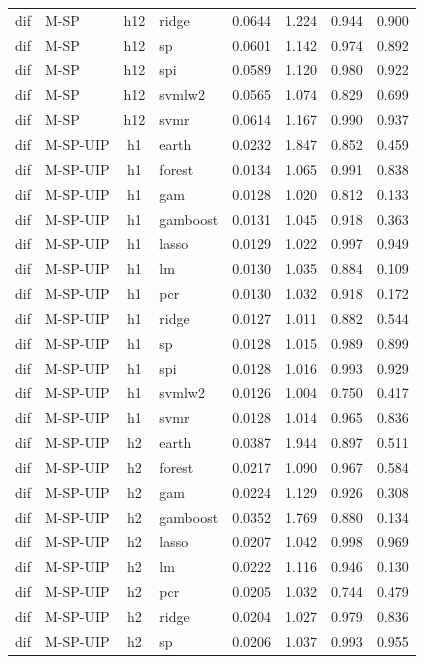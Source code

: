 \begin{ThreePartTable}
\begin{longtable}[t]{llclcccc}
dif & M-SP & h12 & ridge & 0.0644 & 1.224 & 0.944 & 0.900\\
dif & M-SP & h12 & sp & 0.0601 & 1.142 & 0.974 & 0.892\\
dif & M-SP & h12 & spi & 0.0589 & 1.120 & 0.980 & 0.922\\
dif & M-SP & h12 & svmlw2 & 0.0565 & 1.074 & 0.829 & 0.699\\
dif & M-SP & h12 & svmr & 0.0614 & 1.167 & 0.990 & 0.937\\
\addlinespace
dif & M-SP-UIP & h1 & earth & 0.0232 & 1.847 & 0.852 & 0.459\\
dif & M-SP-UIP & h1 & forest & 0.0134 & 1.065 & 0.991 & 0.838\\
dif & M-SP-UIP & h1 & gam & 0.0128 & 1.020 & 0.812 & 0.133\\
dif & M-SP-UIP & h1 & gamboost & 0.0131 & 1.045 & 0.918 & 0.363\\
dif & M-SP-UIP & h1 & lasso & 0.0129 & 1.022 & 0.997 & 0.949\\
dif & M-SP-UIP & h1 & lm & 0.0130 & 1.035 & 0.884 & 0.109\\
dif & M-SP-UIP & h1 & pcr & 0.0130 & 1.032 & 0.918 & 0.172\\
dif & M-SP-UIP & h1 & ridge & 0.0127 & 1.011 & 0.882 & 0.544\\
dif & M-SP-UIP & h1 & sp & 0.0128 & 1.015 & 0.989 & 0.899\\
dif & M-SP-UIP & h1 & spi & 0.0128 & 1.016 & 0.993 & 0.929\\
dif & M-SP-UIP & h1 & svmlw2 & 0.0126 & 1.004 & 0.750 & 0.417\\
dif & M-SP-UIP & h1 & svmr & 0.0128 & 1.014 & 0.965 & 0.836\\
\addlinespace
dif & M-SP-UIP & h2 & earth & 0.0387 & 1.944 & 0.897 & 0.511\\
dif & M-SP-UIP & h2 & forest & 0.0217 & 1.090 & 0.967 & 0.584\\
dif & M-SP-UIP & h2 & gam & 0.0224 & 1.129 & 0.926 & 0.308\\
dif & M-SP-UIP & h2 & gamboost & 0.0352 & 1.769 & 0.880 & 0.134\\
dif & M-SP-UIP & h2 & lasso & 0.0207 & 1.042 & 0.998 & 0.969\\
dif & M-SP-UIP & h2 & lm & 0.0222 & 1.116 & 0.946 & 0.130\\
dif & M-SP-UIP & h2 & pcr & 0.0205 & 1.032 & 0.744 & 0.479\\
dif & M-SP-UIP & h2 & ridge & 0.0204 & 1.027 & 0.979 & 0.836\\
dif & M-SP-UIP & h2 & sp & 0.0206 & 1.037 & 0.993 & 0.955\\

\end{longtable}
\end{ThreePartTable}
